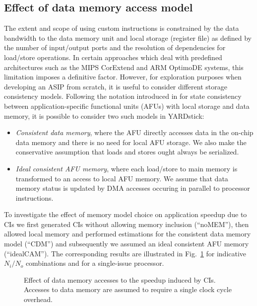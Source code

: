 \documentclass{comjnl}
\begin{document}
\subsection{Effect of data memory access model}
\label{Sec:MemoryAccessModel}
The extent and scope of using custom instructions is constrained by the data bandwidth to the data memory unit and local storage (register file) as defined by the number of input/output ports and the resolution of dependencies for load/store operations. In certain approaches \cite{ClarkN05,Leupers06} which deal with predefined architectures such as the MIPS CorExtend and ARM OptimoDE systems, this limitation imposes a definitive factor. However, for exploration purposes when developing an ASIP from scratch, it is useful to consider different storage consistency models. Following the notation introduced in \cite{Biswas07} for state consistency between application-specific functional units (AFUs) with local storage and data memory, it is possible to consider two such models in YARDstick:
\begin{itemize}
\item {{\it Consistent data memory}, where the AFU directly accesses data in the on-chip data memory and there is no need for local AFU storage. We also make the conservative assumption that loads and stores ought always be serialized.}
\item {{\it Ideal consistent AFU memory}, where each load/store to main memory is transformed to an access to local AFU memory. We assume that data memory status is updated by DMA accesses occuring in parallel to processor instructions.}
\end{itemize}   

To investigate the effect of memory model choice on application speedup due to CIs we first generated CIs without allowing memory inclusion (``noMEM''), then allowed local memory and performed estimations for the consistent data memory model (``CDM'') and subsequently we assumed an ideal consistent AFU memory (``idealCAM''). The corresponding results are illustrated in Fig.~\ref{Fig:9} for indicative $N_{i}/N_{o}$ combinations and for a single-issue processor. 

\begin{figure}[tb]
  \centering
  \caption{Effect of data memory accesses to the speedup induced by CIs. Accesses to data memory are assumed to require a single clock cycle overhead.}
  \label{Fig:9}
  \vspace{-0.25cm}
\end{figure}
\end{document}
